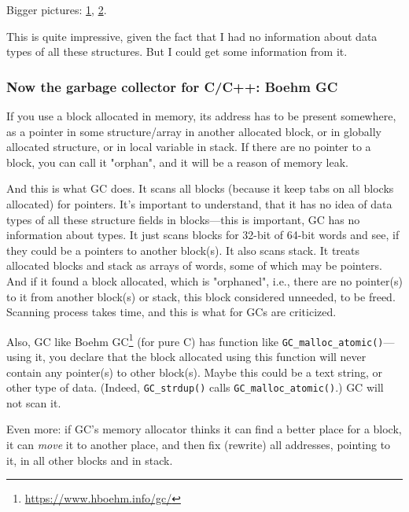 Bigger pictures:
\href{https://raw.githubusercontent.com/DennisYurichev/RE-for-beginners/master/advanced/450_more_ptrs/oracle1.png}{1},
\href{https://raw.githubusercontent.com/DennisYurichev/RE-for-beginners/master/advanced/450_more_ptrs/oracle2.png}{2}.

This is quite impressive, given the fact that I had no information about data types of all these structures.
But I could get some information from it.

\subsubsection{Now the garbage collector for C/C++: Boehm GC}

If you use a block allocated in memory, its address has to be present somewhere, as a pointer in some structure/array in another allocated block,
or in globally allocated structure, or in local variable in stack.
If there are no pointer to a block, you can call it "orphan", and it will be a reason of memory leak.

And this is what \ac{GC} does.
It scans all blocks (because it keep tabs on all blocks allocated) for pointers.
It's important to understand, that it has no idea of data types of all these structure fields in blocks---this is important, \ac{GC} has no information about types.
It just scans blocks for 32-bit of 64-bit words and see, if they could be a pointers to another block(s).
It also scans stack.
It treats allocated blocks and stack as arrays of words, some of which may be pointers.
And if it found a block allocated, which is "orphaned", i.e., there are no pointer(s) to it from another block(s) or stack, this block considered unneeded, to be freed.
Scanning process takes time, and this is what for \ac{GC}s are criticized.

Also, \ac{GC} like Boehm GC\footnote{\url{https://www.hboehm.info/gc/}} (for pure C) has function like \verb|GC_malloc_atomic()|---using it, you declare that the block allocated
using this function will never contain any pointer(s) to other block(s).
Maybe this could be a text string, or other type of data.
(Indeed, \verb|GC_strdup()| calls \verb|GC_malloc_atomic()|.)
\ac{GC} will not scan it.

Even more: if \ac{GC}'s memory allocator thinks it can find a better place for a block, it can \emph{move} it to another place, and then fix (rewrite) all addresses,
pointing to it, in all other blocks and in stack.

